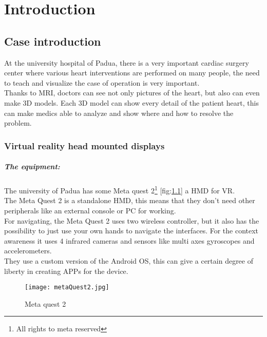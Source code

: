 
\chapter{Introduction}
\label{chp:intro}

\section{Case introduction}

At the university hospital of Padua, 
there is a very important cardiac surgery center where various heart interventions are performed on many people,
the need to teach and visualize the case of operation is very important. \\
Thanks to MRI, doctors can see not only pictures of the heart, but also can even make 3D models.
Each 3D model can show every detail of the patient heart, this can make medics able to analyze and show where and how to resolve the problem.

\subsection{Virtual reality head mounted displays}

\paragraph{The equipment:}
The university of Padua has some Meta quest 2\footnote{All rights to meta reserved} [fig:\ref{fig:metaQuest2}] a \ac{HMD} for \ac{VR}. \\
The Meta Quest 2 is a standalone \ac{HMD}, this means that they don't need other peripherals like an external console or \ac{PC} for working.\\
For navigating, the Meta Quest 2 uses two wireless controller, but it also has the possibility to just use your own hands to navigate the interfaces.
For the context awareness it uses 4 infrared cameras and sensors like multi axes gyroscopes and accelerometers.\\
They use a custom version of the Android \ac{OS}, this can give a certain degree of liberty in creating APPs for the device.

\begin{figure}[h]
  \centering
  \texttt{[image: metaQuest2.jpg]}
  \caption{Meta quest 2}
  \label{fig:metaQuest2}
\end{figure}

